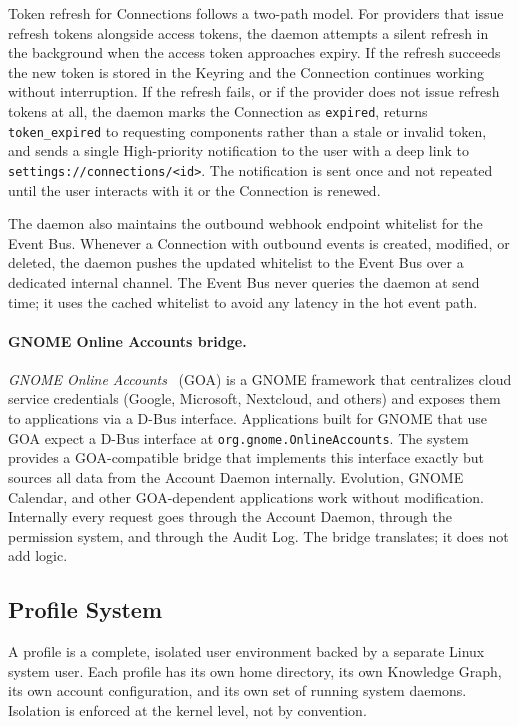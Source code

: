 Token refresh for Connections follows a two-path model. For providers that
issue refresh tokens alongside access tokens, the daemon attempts a silent
refresh in the background when the access token approaches expiry. If the
refresh succeeds the new token is stored in the Keyring and the Connection
continues working without interruption. If the refresh fails, or if the
provider does not issue refresh tokens at all, the daemon marks the Connection
as \texttt{expired}, returns \texttt{token\_expired} to requesting components
rather than a stale or invalid token, and sends a single High-priority
notification to the user with a deep link to
\texttt{settings://connections/<id>}. The notification is sent once and not
repeated until the user interacts with it or the Connection is renewed.

The daemon also maintains the outbound webhook endpoint whitelist for the
Event Bus. Whenever a Connection with outbound events is created, modified,
or deleted, the daemon pushes the updated whitelist to the Event Bus over a
dedicated internal channel. The Event Bus never queries the daemon at send
time; it uses the cached whitelist to avoid any latency in the hot event path.

\paragraph{GNOME Online Accounts bridge.}
\emph{GNOME Online Accounts}~\cite{gnome:goa} (GOA) is a GNOME framework
that centralizes cloud service credentials (Google, Microsoft, Nextcloud, and
others) and exposes them to applications via a D-Bus interface.
Applications built for GNOME that use GOA expect a D-Bus
interface at \texttt{org.gnome.OnlineAccounts}. The system provides a
GOA-compatible bridge that implements this interface exactly but sources all
data from the Account Daemon internally. Evolution, GNOME Calendar, and other
GOA-dependent applications work without modification. Internally every request
goes through the Account Daemon, through the permission system, and through
the Audit Log. The bridge translates; it does not add logic.

\subsection{Profile System}
\label{sec:profiles}

A profile is a complete, isolated user environment backed by a separate Linux
system user. Each profile has its own home directory, its own Knowledge Graph,
its own account configuration, and its own set of running system daemons.
Isolation is enforced at the kernel level, not by convention.

